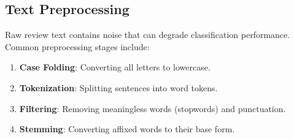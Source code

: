 \subsection{Text Preprocessing}

Raw review text contains noise that can degrade classification performance. Common preprocessing stages include:

\begin{enumerate}
  \item \textbf{Case Folding}: Converting all letters to lowercase.
  \item \textbf{Tokenization}: Splitting sentences into word tokens.
  \item \textbf{Filtering}: Removing meaningless words (stopwords) and punctuation.
  \item \textbf{Stemming}: Converting affixed words to their base form.
\end{enumerate}
